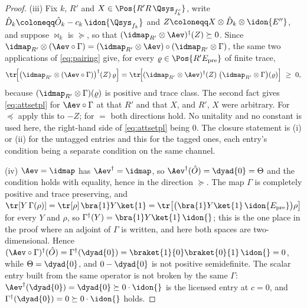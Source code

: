 \begin{proof}
(iii) Fix $k$, $R'$ and $X\in\Pos{R'R\,\Qsys_{f_k^c}}$, write
$\hat D_k\coloneqq\hat O_k-c_k\,\idon{\Qsys_{f_k}}$ and
$Z\coloneqq X\otimes\hat D_k\otimes\idon{E''}$, and suppose $\bowtie_k$ is
$\succeq$, so that $(\idmap_{R'}\otimes\Aev)^{\dagger}(Z)\succeq0$. Since
$\idmap_{R'}\otimes(\Aev\circ\Gamma)
=(\idmap_{R'}\otimes\Aev)\circ(\idmap_{R'}\otimes\Gamma)$, the same two
applications of \eqref{eq:pairing} give, for every
$\varrho\in\Pos{R'E_{\mathrm{pre}}}$ of finite trace,
\begin{equation*}
  \tr\!\Big[\big(\idmap_{R'}\otimes(\Aev\circ\Gamma)\big)^{\dagger}(Z)\,
    \varrho\Big]
  =\tr\!\Big[(\idmap_{R'}\otimes\Aev)^{\dagger}(Z)\;
    \big(\idmap_{R'}\otimes\Gamma\big)(\varrho)\Big]\;\ge\;0 ,
\end{equation*}
because $(\idmap_{R'}\otimes\Gamma)(\varrho)$ is positive and trace class. The
second fact gives \eqref{eq:attsetpl} for $\Aev\circ\Gamma$ at that $R'$ and
that $X$, and $R'$, $X$ were arbitrary. For $\preceq$ apply this to $-Z$; for
$=$ both directions hold. No unitality and no constant is used here, the
right-hand side of \eqref{eq:attsetpl} being $0$. The closure statement is (i)
or (ii) for the untagged entries and this for the tagged ones, each entry's
condition being a separate condition on the same channel.

(iv) $\Aev=\idmap$ has $\Aev^{\dagger}=\idmap$, so
$\Aev^{\dagger}(\hat O)=\dyad{0}=\Theta$ and the condition holds with equality,
hence in the direction $\succeq$. The map $\Gamma$ is completely positive and
trace preserving, and $\tr[Y\,\Gamma(\rho)]=\tr[\rho]\,\bra{1}Y\ket{1}
=\tr\big[\big(\bra{1}Y\ket{1}\,\idon{E_{\mathrm{pre}}}\big)\rho\big]$ for every
$Y$ and $\rho$, so $\Gamma^{\dagger}(Y)=\bra{1}Y\ket{1}\,\idon{}$; this is the
one place in the proof where an adjoint of $\Gamma$ is written, and here both
spaces are two-dimensional. Hence
$(\Aev\circ\Gamma)^{\dagger}(\hat O)=\Gamma^{\dagger}(\dyad{0})
=\braket{1}{0}\braket{0}{1}\,\idon{}=0$, while $\Theta=\dyad{0}$, and
$0-\dyad{0}$ is not positive semidefinite. The scalar entry built from the
same operator is not broken by the same $\Gamma$:
$\Aev^{\dagger}(\dyad{0})=\dyad{0}\succeq0\cdot\idon{}$ is the licensed entry
at $c=0$, and $\Gamma^{\dagger}(\dyad{0})=0\succeq0\cdot\idon{}$ holds.
\end{proof}
